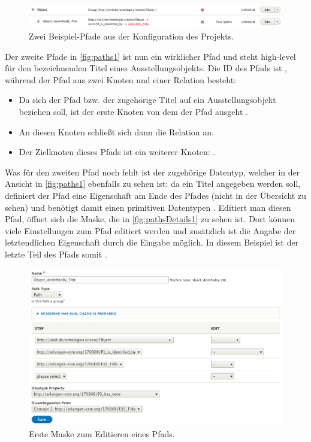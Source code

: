 \begin{figure}[htb]
    \centering
    \includegraphics[width=\textwidth]{Figures/berndl/paths1}
    \caption{\label{fig:paths1} Zwei Beispiel-Pfade aus der \wisski Konfiguration des \visit Projekts.}
\end{figure}

Der zweite Pfade in \autoref{fig:paths1} ist nun ein wirklicher Pfad und steht high-level für den bezeichnenden Titel eines Ausstellungsobjekts. Die ID des Pfads ist \texttt{}, während der Pfad aus zwei Knoten und einer Relation besteht:

\begin{itemize}
	\item Da sich der Pfad bzw. der zugehörige Titel auf ein Ausstellungsobjekt beziehen soll, ist der erste Knoten von dem der Pfad ausgeht \texttt{}.
	\item An diesen Knoten schließt sich dann die Relation \texttt{} an.
	\item Der Zielknoten dieses Pfads ist ein weiterer Knoten: \texttt{}.
\end{itemize}

Was für den zweiten Pfad noch fehlt ist der zugehörige Datentyp, welcher in der Ansicht in \autoref{fig:paths1} ebenfalls zu sehen ist: da ein Titel angegeben werden soll, definiert der Pfad eine Eigenschaft am Ende des Pfades (nicht in der Übersicht zu sehen) und benötigt damit einen primitiven Datentypen \texttt{}. Editiert man diesen Pfad, öffnet sich die Maske, die in \autoref{fig:pathsDetails1} zu sehen ist. Dort können viele Einstellungen zum Pfad editiert werden und zusätzlich ist die Angabe der letztendlichen Eigenschaft durch die Eingabe \texttt{} möglich. In diesem Beispiel ist der letzte Teil des Pfads somit \texttt{}.

\begin{figure}[htb]
    \centering
    \includegraphics[width=\textwidth]{Figures/berndl/pathsDetails1}
    \caption{\label{fig:pathsDetails1} Erste Maske zum Editieren eines \wisski Pfads.}
\end{figure}

